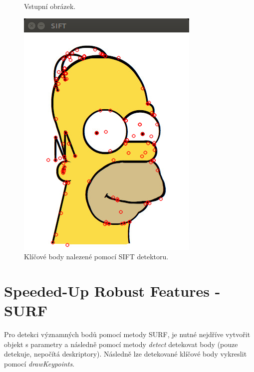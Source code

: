 \documentclass[12pt, a4paper]{article}
\begin{document}
\begin{figure}[!ht]
\begin{minipage}[t]{0.49\textwidth}
		\caption{Vstupní obrázek.}
	\end{minipage}%
	\hfill
	\begin{minipage}[t]{0.49\textwidth}
		\includegraphics[width = \textwidth]{./sift.png}
		\caption{Klíčové body nalezené pomocí SIFT detektoru.}
	\end{minipage}%
\end{figure}

\newpage

\section{Speeded-Up Robust Features - SURF}

\par{Pro detekci významných bodů pomocí metody SURF, je nutné nejdříve vytvořit objekt s parametry a následně pomocí metody \textit{detect} detekovat body (pouze detekuje, nepočítá deskriptory). Následně lze detekované klíčové body vykreslit pomocí \textit{drawKeypoints}.}
\end{document}
